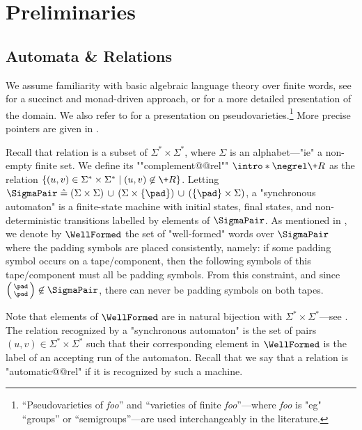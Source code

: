 \section{Preliminaries}
\label{sec:preliminaries}

\subsection{Automata \& Relations}

We assume familiarity with basic algebraic language theory over finite words, see \cite[\S 1, 2, 4, pp.~3--66 \& pp.~107--156]{Bojanczyk2020MSO} for a succinct and monad-driven approach, or \cite[\S I--XIV, pp.~3--247]{Pin2022MathematicalFoundations} for a more detailed presentation of the domain.
We also refer to \cite{StraubingWeil2021Varieties} for a presentation on pseudovarieties.\footnote{``Pseudovarieties of \emph{foo}'' and ``varieties of finite \emph{foo}''---where \emph{foo} is "eg" ``groups''
or ``semigroups''---are used interchangeably in the literature.}
More precise pointers are given in .

Recall that relation is a subset of $\Sigma^*\times\Sigma^*$,
where $\Sigma$ is an alphabet---"ie" a non-empty finite set.
We define its \AP""complement@@rel"" \AP$\intro*\negrel \+R$ as the relation $\{(u,v) \in \Sigma^*\times \Sigma^* \mid (u,v) \not\in \+R\}$.
Letting
$\SigmaPair \defeq
(\Sigma \times \Sigma) \,\cup\,
(\Sigma \times \{\pad\}) \,\cup\,
(\{\pad\} \times \Sigma)$, a "synchronous automaton" is a finite-state machine with initial states, final states, and
non-deterministic transitions labelled by elements of $\SigmaPair$.
As mentioned in , we denote by $\WellFormed$ the set of "well-formed" words over $\SigmaPair$ where the padding symbols are placed consistently, namely: if some padding symbol occurs on a tape/component, then the following symbols of this tape/component must all be padding symbols.
From this constraint, and since $\pair{\pad}{\pad} \not\in \SigmaPair$,
there can never be padding symbols on both tapes.

Note that elements of $\WellFormed$ are in natural bijection with $\Sigma^*\times\Sigma^*$---see
.
The relation recognized by a "synchronous automaton" is the set of pairs $(u,v) \in \Sigma^*\times\Sigma^*$ such that their corresponding element in $\WellFormed$ is the label of
an accepting run of the automaton. Recall that we say that a relation is \AP"automatic@@rel" if it is recognized 
by such a machine.

